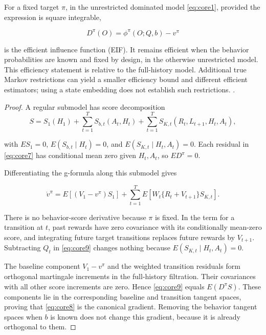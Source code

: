 \begin{theorem}\label{core-result-2}
For a fixed target \(\pi\), in the unrestricted dominated model \eqref{eq:core1}, provided the expression is square integrable,

\begin{equation}\label{eq:core8}
D^{\pi}(O)=\phi^{\pi}(O;Q,b)-v^{\pi}
\end{equation}

is the efficient influence function (EIF). It remains efficient when the behavior probabilities are known and fixed by design, in the otherwise unrestricted model. This efficiency statement is relative to the full-history model. Additional true Markov restrictions can yield a smaller efficiency bound and different efficient estimators; using a state embedding does not establish such restrictions. \citep{kallus2020drl}.
\end{theorem}
\begin{proof}
A regular submodel has score decomposition
\[
S=S_1(H_1)+\sum_{t=1}^{T}S_{b,t}(A_t,H_t)
+\sum_{t=1}^{T}S_{K,t}(R_t,L_{t+1},H_t,A_t),
\]

with \(E S_1=0\), \(E(S_{b,t}\mid H_t)=0\), and \(E(S_{K,t}\mid H_t,A_t)=0\). Each residual in \eqref{eq:core7} has conditional mean zero given \(H_t,A_t\), so \(E D^{\pi}=0\).

Differentiating the g-formula along this submodel gives

\begin{equation}\label{eq:core9}
\dot v^{\pi}
=E[(V_1-v^{\pi})S_1]
+\sum_{t=1}^{T}E[W_t\{R_t+V_{t+1}\}S_{K,t}].
\end{equation}

There is no behavior-score derivative because \(\pi\) is fixed. In the term for a transition at \(t\), past rewards have zero covariance with its conditionally mean-zero score, and integrating future target transitions replaces future rewards by \(V_{t+1}\). Subtracting \(Q_t\) in \eqref{eq:core9} changes nothing because \(E(S_{K,t}\mid H_t,A_t)=0\).

The baseline component \(V_1-v^{\pi}\) and the weighted transition residuals form orthogonal martingale increments in the full-history filtration. Their covariances with all other score increments are zero. Hence \eqref{eq:core9} equals \(E(D^{\pi}S)\). These components lie in the corresponding baseline and transition tangent spaces, proving that \eqref{eq:core8} is the canonical gradient. Removing the behavior tangent spaces when \(b\) is known does not change this gradient, because it is already orthogonal to them.
\end{proof}

